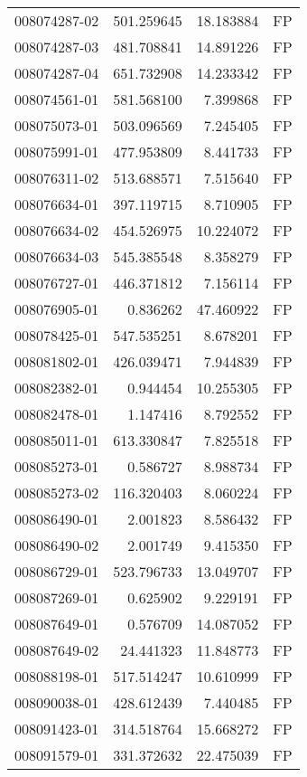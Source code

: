 \begin{tabular}{lrrl}
008074287-02 &  501.259645 &    18.183884 &   FP \\
008074287-03 &  481.708841 &    14.891226 &   FP \\
008074287-04 &  651.732908 &    14.233342 &   FP \\
008074561-01 &  581.568100 &     7.399868 &   FP \\
008075073-01 &  503.096569 &     7.245405 &   FP \\
008075991-01 &  477.953809 &     8.441733 &   FP \\
008076311-02 &  513.688571 &     7.515640 &   FP \\
008076634-01 &  397.119715 &     8.710905 &   FP \\
008076634-02 &  454.526975 &    10.224072 &   FP \\
008076634-03 &  545.385548 &     8.358279 &   FP \\
008076727-01 &  446.371812 &     7.156114 &   FP \\
008076905-01 &    0.836262 &    47.460922 &   FP \\
008078425-01 &  547.535251 &     8.678201 &   FP \\
008081802-01 &  426.039471 &     7.944839 &   FP \\
008082382-01 &    0.944454 &    10.255305 &   FP \\
008082478-01 &    1.147416 &     8.792552 &   FP \\
008085011-01 &  613.330847 &     7.825518 &   FP \\
008085273-01 &    0.586727 &     8.988734 &   FP \\
008085273-02 &  116.320403 &     8.060224 &   FP \\
008086490-01 &    2.001823 &     8.586432 &   FP \\
008086490-02 &    2.001749 &     9.415350 &   FP \\
008086729-01 &  523.796733 &    13.049707 &   FP \\
008087269-01 &    0.625902 &     9.229191 &   FP \\
008087649-01 &    0.576709 &    14.087052 &   FP \\
008087649-02 &   24.441323 &    11.848773 &   FP \\
008088198-01 &  517.514247 &    10.610999 &   FP \\
008090038-01 &  428.612439 &     7.440485 &   FP \\
008091423-01 &  314.518764 &    15.668272 &   FP \\
008091579-01 &  331.372632 &    22.475039 &   FP \\

\end{tabular}
